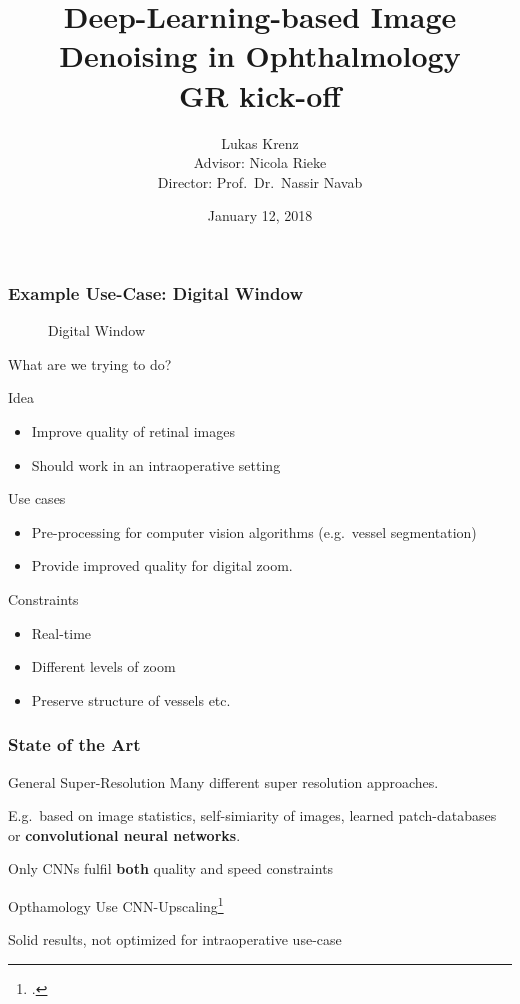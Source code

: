 \documentclass{beamer}
\title{Deep-Learning-based Image Denoising in Ophthalmology\\GR kick-off}
\author{Lukas Krenz\\Advisor: Nicola Rieke\\Director: Prof.\ Dr.\ Nassir Navab}
\date{January 12, 2018}
\institute{TUM, Chair for Computer Aided Medical Procedures \textit{\&} Augmented Reality}
\begin{document}
\maketitle

\begin{frame}
  \frametitle{Example Use-Case: Digital Window}
   \begin{figure}[h]
    \centering
    \caption*{Digital Window}
    \label{fig:digital-window}
  \end{figure}
\end{frame}


\begin{frame}{What are we trying to do?}
\begin{block}{Idea}
\begin{itemize}
\item Improve quality of retinal images
\item Should work in an intraoperative setting
\end{itemize}
\end{block}

\begin{block}{Use cases}
\begin{itemize}
\item Pre-processing for computer vision algorithms (e.g.\ vessel segmentation)
\item Provide improved quality for digital zoom.
\end{itemize}
\end{block}

\begin{block}{Constraints}
  \begin{itemize}
  \item Real-time
  \item Different levels of zoom
  \item Preserve structure of vessels etc.
  \end{itemize}
\end{block}
\end{frame}

\begin{frame}
  \frametitle{State of the Art}

\begin{block}{General Super-Resolution}
Many different super resolution approaches.
    
E.g.\ based on image statistics, self-simiarity of images, learned patch-databases or \textbf{convolutional neural networks}.

Only CNNs fulfil \textbf{both} quality and speed constraints
\end{block}


\begin{block}{Opthamology}
Use CNN-Upscaling\footcite{SaliencyGAN} 

Solid results, not optimized for intraoperative use-case
\end{block}
\end{frame}
\end{document}
